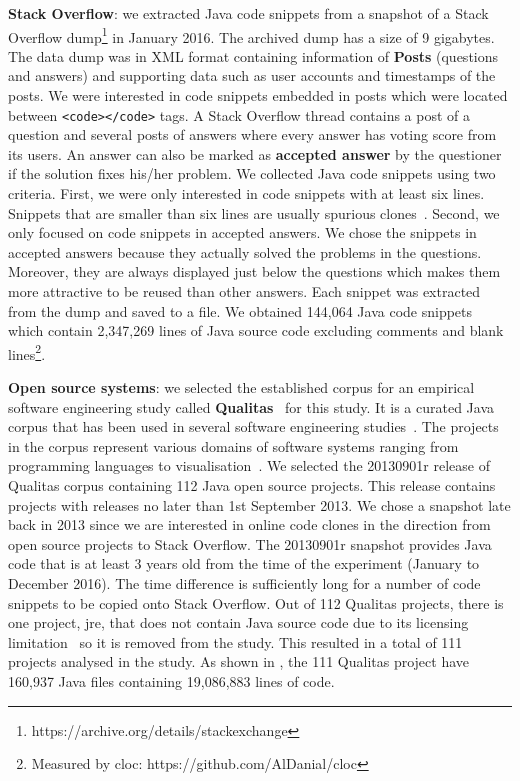 \documentclass[sigconf,review, anonymous]{acmart}
\begin{document}
\textbf{Stack Overflow}: we extracted Java code snippets from a snapshot of a Stack Overflow dump\footnote{https://archive.org/details/stackexchange} in January 2016. The archived dump has a size of 9 gigabytes. The data dump was in XML format containing information of \textbf{Posts} (questions and answers) and supporting data such as user accounts and timestamps of the posts. We were interested in code snippets embedded in posts which were located between {\small\texttt{<code></code>}} tags. A Stack Overflow thread contains a post of a question and several posts of answers where every answer has voting score from its users. An answer can also be marked as \textbf{accepted answer} by the questioner if the solution fixes his/her problem. We collected Java code snippets using two criteria. First, we were only interested in code snippets with at least six lines. Snippets that are smaller than six lines are usually spurious clones~\cite{Bellon2007}. Second, we only focused on code snippets in accepted answers. We chose the snippets in accepted answers because they actually solved the problems in the questions. Moreover, they are always displayed just below the questions which makes them more attractive to be reused than other answers. Each snippet was extracted from the dump and saved to a file. 
We obtained 144,064 Java code snippets which contain 2,347,269 lines of Java source code excluding comments and blank lines\footnote{Measured by cloc: https://github.com/AlDanial/cloc}.

\textbf{Open source systems}: we selected the established corpus for an empirical software engineering study called \textbf{Qualitas}~\cite{QualitasCorpus} for this study. It is a curated Java corpus that has been used in several software engineering studies~\cite{Taube-Schock2011,Beckman2011,Vasilescu2011,Omar2012}. The projects in the corpus represent various domains of software systems ranging from programming languages to visualisation~\cite{QualitasCorpus}. We selected the 20130901r release of Qualitas corpus containing 112 Java open source projects. This release contains projects with releases no later than 1st September 2013. We chose a snapshot late back in 2013 since we are interested in online code clones in the direction from open source projects to Stack Overflow. The 20130901r snapshot provides Java code that is at least 3 years old from the time of the experiment (January to December 2016). The time difference is sufficiently long for a number of code snippets to be copied onto Stack Overflow. Out of 112 Qualitas projects, there is one project, \textsf{jre}, that does not contain Java source code due to its licensing limitation~\cite{QualitasCorpus} so it is removed from the study. This resulted in a total of 111 projects analysed in the study. As shown in , the 111 Qualitas project have 160,937 Java files containing 19,086,883 lines of code. %
\end{document}
